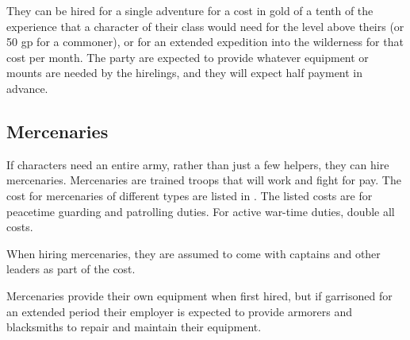 \begin{multicols*}{2}
They can be hired for a single adventure for a cost in gold of a tenth of the experience that a character of their class would need for the level above theirs (or 50 gp for a commoner), or for an extended expedition into the wilderness for that cost per month. The party are expected to provide whatever equipment or mounts are needed by the hirelings, and they will expect half payment in advance.


\subsection{Mercenaries}\label{sec:Mercenaries}
If characters need an entire army, rather than just a few helpers, they can hire mercenaries. Mercenaries are trained troops that will work and fight for pay. The cost for mercenaries of different types are listed in . The listed costs are for peacetime guarding and patrolling duties. For active war-time duties, double all costs.

When hiring mercenaries, they are assumed to come with captains and other leaders as part of the cost.

Mercenaries provide their own equipment when first hired, but if garrisoned for an extended period their employer is expected to provide armorers and blacksmiths to repair and maintain their equipment.


\end{multicols*}
